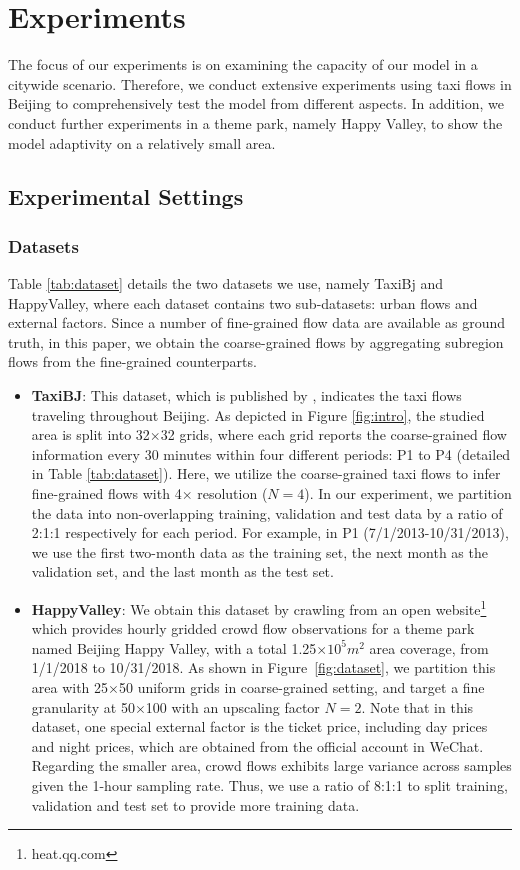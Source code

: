 \section{Experiments}\label{sec:exp}
The focus of our experiments is on examining the capacity of our model in a citywide scenario. Therefore, we conduct extensive experiments using taxi flows in Beijing to comprehensively test the model from different aspects. In addition, we conduct further experiments in a theme park, namely Happy Valley, to show the model adaptivity on a relatively small area. 

\subsection{Experimental Settings}
\subsubsection{Datasets}
Table \ref{tab:dataset} details the two datasets we use, namely TaxiBj and HappyValley, where each dataset contains two sub-datasets: urban flows and external factors. Since a number of fine-grained flow data are available as ground truth, in this paper, we obtain the coarse-grained flows by aggregating subregion flows from the fine-grained counterparts.
\begin{itemize}[leftmargin=*]
	\item \textbf{TaxiBJ}: This dataset, which is published by \citeauthor{zhang2017deep} \cite{zhang2017deep}, indicates the taxi flows traveling throughout Beijing. As depicted in Figure \ref{fig:intro}, the studied area is split into 32$\times$32 grids, where each grid reports the coarse-grained flow information every 30 minutes within four different periods: P1 to P4 (detailed in Table \ref{tab:dataset}). Here, we utilize the coarse-grained taxi flows to infer fine-grained flows with 4$\times$ resolution ($N=4$). In our experiment, we partition the data into non-overlapping training, validation and test data by a ratio of 2:1:1 respectively for each period. For example, in P1 (7/1/2013-10/31/2013), we use the first two-month data as the training set, the next month as the validation set, and the last month as the test set.
	\item \textbf{HappyValley}: We obtain this dataset by crawling from an open website\footnote{heat.qq.com} which provides hourly gridded crowd flow observations for a theme park named Beijing Happy Valley, with a total 1.25$\times10^5 m^2$ area coverage, from 1/1/2018 to 10/31/2018. As shown in Figure~\ref{fig:dataset}, we partition this area with 25$\times$50 uniform grids in coarse-grained setting, and target a fine granularity at 50$\times$100 with an upscaling factor $N=2$. Note that in this dataset, one special external factor is the ticket price, including day prices and night prices, which are obtained from the official account in WeChat. Regarding the smaller area, crowd flows exhibits large variance across samples given the 1-hour sampling rate. Thus, we use a ratio of 8:1:1 to split training, validation and test set to provide more training data.
\end{itemize}
